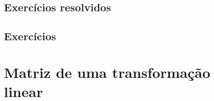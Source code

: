 \subsection*{Exercícios resolvidos}

\construirExeresol

\subsection*{Exercícios}

\construirExer



\section{Matriz de uma transformação linear}


